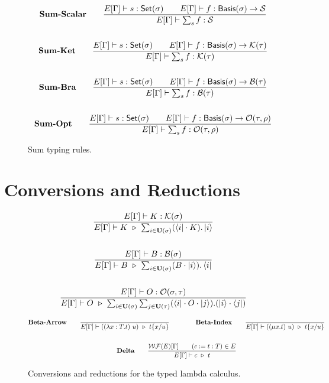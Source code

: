 \documentclass{article}
\begin{document}
\begin{figure}[h]
    \begin{gather*}
        \textbf{Sum-Scalar} \qquad
        \frac{E[\Gamma] \vdash s : \mathsf{Set}(\sigma) \qquad E[\Gamma] \vdash f : \mathsf{Basis}(\sigma) \to \mathcal{S}}{E[\Gamma] \vdash \sum_{s} f : \mathcal{S}} \\
        \\
        \textbf{Sum-Ket} \qquad
        \frac{E[\Gamma] \vdash s : \mathsf{Set}(\sigma) \qquad E[\Gamma] \vdash f : \mathsf{Basis}(\sigma) \to \mathcal{K}(\tau)}{E[\Gamma] \vdash \sum_{s} f : \mathcal{K}(\tau)} \\
        \\
        \textbf{Sum-Bra} \qquad
        \frac{E[\Gamma] \vdash s : \mathsf{Set}(\sigma) \qquad E[\Gamma] \vdash f : \mathsf{Basis}(\sigma) \to \mathcal{B}(\tau)}{E[\Gamma] \vdash \sum_{s} f : \mathcal{B}(\tau)} \\
        \\
        \textbf{Sum-Opt} \qquad
        \frac{E[\Gamma] \vdash s : \mathsf{Set}(\sigma) \qquad E[\Gamma] \vdash f : \mathsf{Basis}(\sigma) \to \mathcal{O}(\tau, \rho)}{E[\Gamma] \vdash \sum_{s} f : \mathcal{O}(\tau, \rho)}
    \end{gather*}
    \caption{Sum typing rules.}
\end{figure}

\clearpage
\section{Conversions and Reductions}

\begin{figure}[h]
    \begin{gather*}
        \frac{E[\Gamma] \vdash K : \KType(\sigma)}{E[\Gamma] \vdash K \ \reduce\ \sum_{i \in \mathbf{U}(\sigma)}(\bra{i}\cdot K).\ket{i}} \\
        \\
        \frac{E[\Gamma] \vdash B : \BType(\sigma)}{E[\Gamma] \vdash B \ \reduce\ \sum_{i \in \mathbf{U}(\sigma)}(B \cdot \ket{i}).\bra{i}} \\
        \\
        \frac{E[\Gamma] \vdash O : \OType(\sigma, \tau)}{E[\Gamma] \vdash O \ \reduce\ \sum_{i \in \mathbf{U}(\sigma)} \sum_{j \in \mathbf{U}(\tau)}(\bra{i} \cdot O \cdot \ket{j}).(\ket{i} \cdot \bra{j})}
    \end{gather*}
\end{figure}

\begin{figure}[h]
    \begin{gather*}
        \textbf{Beta-Arrow} \qquad
        \frac{}{E[\Gamma] \vdash ((\lambda x : T.t)\ u)\ \reduce\ t\{x/u\}} 
        \qquad \qquad
        \textbf{Beta-Index} \qquad
        \frac{}{E[\Gamma] \vdash ((\mu x.t)\ u)\ \reduce\ t\{x/u\}} 
        \\
        \\
        \textbf{Delta} \qquad
        \frac{\WF(E)[\Gamma] \qquad (c:=t:T) \in E}{E[\Gamma] \vdash c\ \reduce\ t}
    \end{gather*}
    \caption{Conversions and reductions for the typed lambda calculus.}
\end{figure}
\end{document}

